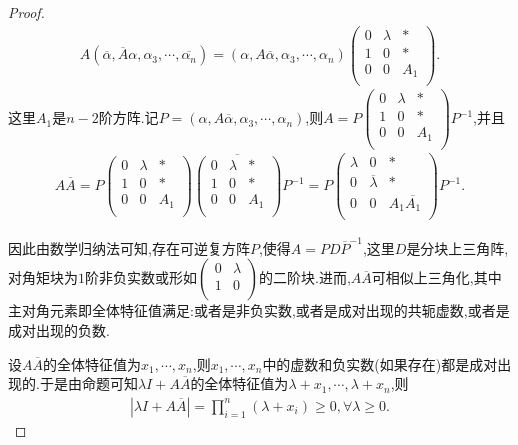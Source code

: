 \documentclass[../../main.tex]{subfiles}
\begin{document}
\begin{proof}
\begin{align*}
A\left( \overline{\alpha },\overline{A}\alpha ,\alpha _3,\cdots ,\overline{\alpha _n} \right) =\left( \alpha ,A\overline{\alpha },\alpha _3,\cdots ,\alpha _n \right) \begin{pmatrix}
0&		\lambda&		*\\
1&		0&		*\\
0&		0&		A_1\\
\end{pmatrix}.
\end{align*}
这里$A_1$是$n-2$阶方阵.记$P=\left( \alpha ,A\overline{\alpha },\alpha _3,\cdots ,\alpha _n \right)$,则$A=P\begin{pmatrix}
0&		\lambda&		*\\
1&		0&		*\\
0&		0&		A_1\\
\end{pmatrix} P^{-1}$,并且
\begin{align*}
A\overline{A}=P\begin{pmatrix}
0&		\lambda&		*\\
1&		0&		*\\
0&		0&		A_1\\
\end{pmatrix} \overline{\begin{pmatrix}
0&		\lambda&		*\\
1&		0&		*\\
0&		0&		A_1\\
\end{pmatrix} }P^{-1}=P\begin{pmatrix}
\lambda&		0&		*\\
0&		\overline{\lambda }&		*\\
0&		0&		A_1\overline{A_1}\\
\end{pmatrix} P^{-1}.
\end{align*}

因此由数学归纳法可知,存在可逆复方阵$P$,使得$A=PD\overline{P}^{-1}$,这里$D$是分块上三角阵,对角矩块为$1$阶非负实数或形如$\begin{pmatrix}
0&		\lambda\\
1&		0\\
\end{pmatrix}$的二阶块.进而,$A\overline{A}$可相似上三角化,其中主对角元素即全体特征值满足:或者是非负实数,或者是成对出现的共轭虚数,或者是成对出现的负数.

设$A\overline{A}$的全体特征值为$x_1,\cdots ,x_n$,则$x_1,\cdots ,x_n$中的虚数和负实数(如果存在)都是成对出现的.于是由命题可知$\lambda I+A\overline{A}$的全体特征值为$\lambda +x_1,\cdots ,\lambda +x_n$,则
\begin{align*}
\left| \lambda I+A\overline{A} \right|=\prod_{i=1}^n{\left( \lambda +x_i \right)}\geqslant 0,\forall \lambda \geqslant 0.
\end{align*}
\end{proof}
\end{document}
